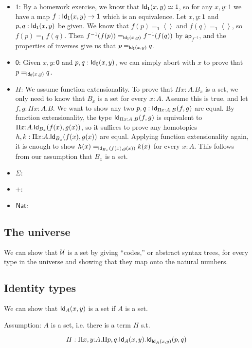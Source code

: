\documentclass[11pt]{article}
\newcommand*{\Void}{\mathsf{0}}
\newcommand*{\Unit}{\mathsf{1}}
\newcommand*{\ap}{\mathsf{ap}}
\begin{document}
\begin{itemize}
\item 
  $\Unit$: By a homework exercise, we know that $\Id{\Unit}(x,y) \simeq \Unit$, so for any $x,y : \Unit$ we have a map $f : \Id{\Unit}(x,y) \to \Unit$ which is an equivalence. Let $x,y : \Unit$ and $p, q : \Id{\Unit}(x,y)$ be given. We know that $f(p) =_\Unit \left<\right>$ and $f(q) =_\Unit \left<\right>$, so $f(p) =_\Unit f(q)$. Then $f^{-1}(f(p)) =_{\Id{\Unit}(x,y)} f^{-1}(f(q))$ by $\ap_{f^{-1}}$, and the properties of inverses give us that $p =_{\Id{\Unit}(x,y)} q$.
\item
  $\Void$: Given $x,y : \Void$ and $p, q : \Id{\Void}(x,y)$, we can simply abort with $x$ to prove that $p =_{\Id{\Void}(x,y)} q$.
\item
  $\Pi$: We assume function extensionality. To prove that $\Pi x{:}A. B_x$ is a set, we only need to know that $B_x$ is a set for every $x{:}A$. Assume this is true, and let $f, g : \Pi x{:}A. B$. We want to show any two $p, q : \mathsf{Id}_{\Pi x {:}A. B}(f,g)$ are equal. By function extensionality, the type $\mathsf{Id}_{\Pi x {:}A. B}(f,g)$ is equivalent to $\Pi x{:}A. \mathsf{Id}_{B_x}(f(x), g(x))$, so it suffices to prove any homotopies $h, k : \Pi x{:}A. \mathsf{Id}_{B_x}(f(x), g(x))$ are equal. Applying function extensionality again, it is enough to show $h(x) =_{\mathsf{Id}_{B_x}(f(x),g(x))} k(x)$ for every $x{:}A$. This follows from our assumption that $B_x$ is a set.
\item
  $\Sigma$: 
\item
  $+$: 
\item
  $\mathsf{Nat}$: 
\end{itemize}

\subsection*{The universe}

We can show that $\mathcal{U}$ is a set by giving ``codes,'' or abstract
syntax trees, for every type in the universe and showing that they map onto
the natural numbers. %

\subsection*{Identity types}

We can show that $\mathsf{Id}_{A}(x,y)$ is a set if $A$ is a set.

Assumption: $A$ is a set, i.e. there is a term $H$ s.t.

\[
H : \Pi{x,y}{:}A.\Pi{p,q}{:}\mathsf{Id}_{A}(x,y).\mathsf{Id}_{\mathsf{Id}_{A}(x,y)}(p,q)
\]
\end{document}
